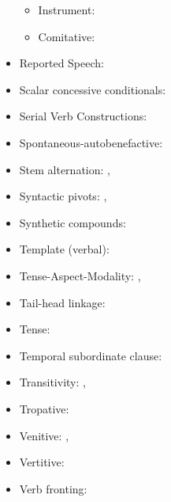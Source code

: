 \documentclass[oldfontcommands,oneside,a4paper,11pt]{article}
\begin{document}
\begin{itemize}
\begin{itemize}
\item Instrument: \citet{jacques16comparative}
\item Comitative: \citet[272-4]{jacques14linking}
\end{itemize}
\item Reported Speech: \citet[241-244]{jacques16complementation}
\item Scalar concessive conditionals: \citet[300]{jacques14linking}
\item Serial Verb Constructions: \citet[253-255]{jacques16complementation}
\item Spontaneous-autobenefactive: \citet{jacques15spontaneous}
\item Stem alternation:  \citet[267]{jacques14linking}, \citet[615]{jacques17sketch}
\item Syntactic pivots: \citet{jacques16relatives}, \citet{jacques16complementation}
\item Synthetic compounds: \citet[1220-3]{jacques12incorp}
\item Template (verbal): \citet[196-199]{jacques13harmonization}
\item Tense-Aspect-Modality:  \citet[265-9]{jacques14linking}, \citet{jacques17sketch}
\item Tail-head linkage:  \citet[279-280]{jacques14linking}
\item Tense: \citet[615-621]{jacques17sketch}
\item Temporal subordinate clause:  \citet[281-295]{jacques14linking}
\item Transitivity: \citet[9-10]{jacques14antipassive}, \citet[625-626]{jacques17sketch}
\item Tropative: \citet{jacques13tropative}
\item Venitive: \citet[200-6]{jacques13harmonization}, \citet{jacques17sketch}
\item Vertitive:  \citet{jacques15spontaneous}
\item Verb fronting:  \citet[280]{jacques14linking}
\end{itemize}



\end{document}
